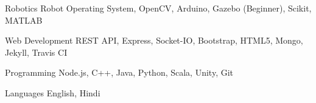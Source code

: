 
\begin{cvskills}

  \cvskill
    {Robotics} %
    {Robot Operating System, OpenCV, Arduino, Gazebo (Beginner), Scikit, MATLAB} %

  \cvskill
    {Web Development} %
    {REST API, Express, Socket-IO, Bootstrap, HTML5, Mongo, Jekyll, Travis CI} %

  \cvskill
    {Programming} %
    {Node.js, C++, Java, Python, Scala, Unity, Git} %

  \cvskill
    {Languages} %
    {English, Hindi} %

\end{cvskills}
